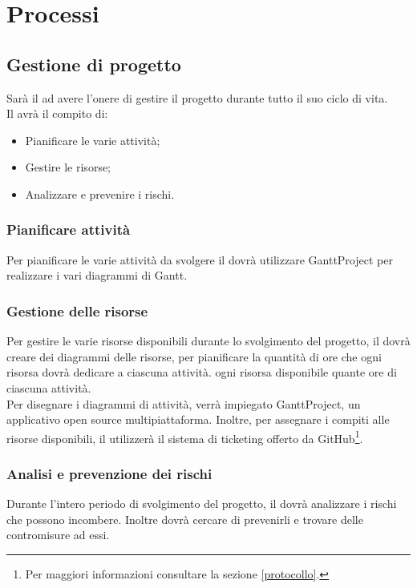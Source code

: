 \section{Processi}
\label{processi}

\subsection{Gestione di progetto}
\label{gestione_progetto}
Sarà il \projectManager{} ad avere l'onere di gestire il progetto durante tutto il suo ciclo di vita.
\\Il \projectManager{} avrà il compito di:
\begin{itemize}
	\item Pianificare le varie attività;
	\item Gestire le risorse;
	\item Analizzare e prevenire i rischi.
\end{itemize}

\subsubsection{Pianificare attività}
\label{pianificare_attività}
Per pianificare le varie attività da svolgere il \projectManager{} dovrà utilizzare GanttProject\glossario{} per realizzare i vari diagrammi di Gantt\glossario{}.

\subsubsection{Gestione delle risorse}
\label{gestione_risorse}
Per gestire le varie risorse disponibili durante lo svolgimento del progetto, il \projectManager{} dovrà creare dei diagrammi delle risorse, per pianificare la quantità di ore che ogni risorsa dovrà dedicare a ciascuna attività. ogni risorsa disponibile quante ore di ciascuna attività.\\ 
Per disegnare i diagrammi di attività, verrà impiegato GanttProject\glossario{}, un applicativo open source multipiattaforma. Inoltre, per assegnare i compiti alle risorse disponibili, il \projectManager{} utilizzerà il sistema di ticketing offerto da GitHub\glossario{}\footnote{Per maggiori informazioni consultare la sezione \ref{protocollo}.}.

\subsubsection{Analisi e prevenzione dei rischi}
\label{analsi_prev_rischi}
Durante l'intero periodo di svolgimento del progetto, il \projectManager{} dovrà analizzare i rischi che possono incombere. Inoltre dovrà cercare di prevenirli e trovare delle contromisure ad essi. 

